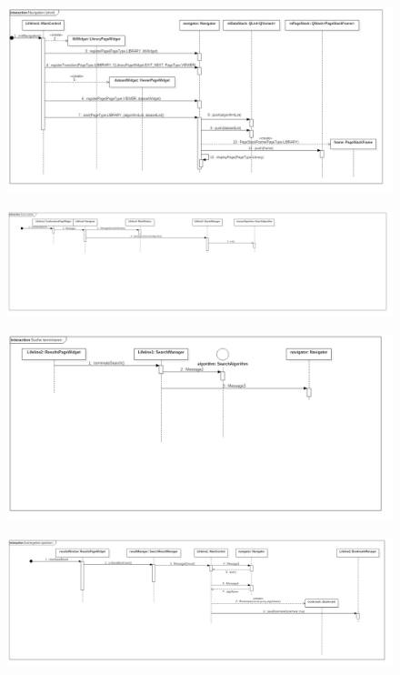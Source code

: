 \begin{figure}[H]
\centering
\includegraphics[width=\linewidth]{img/Klassendiagramm/Sequenzdiagramme/Navigation(short)}
\label{fig:navigation}
\end{figure}

\begin{figure}[H]
\centering
\includegraphics[width=\linewidth]{img/Klassendiagramm/Sequenzdiagramme/SucheStarten}
\label{fig:sucheStarten}
\end{figure}

\begin{figure}[H]
\centering
\includegraphics[width=\linewidth]{img/Klassendiagramm/Sequenzdiagramme/SucheTerminieren}
\label{fig:sucheTerminieren}
\end{figure}

\begin{figure}[H]
\centering
\includegraphics[width=\linewidth]{img/Klassendiagramm/Sequenzdiagramme/SuchergebnisSpeichern}
\label{fig:suchergebnisSpeichern}
\end{figure}